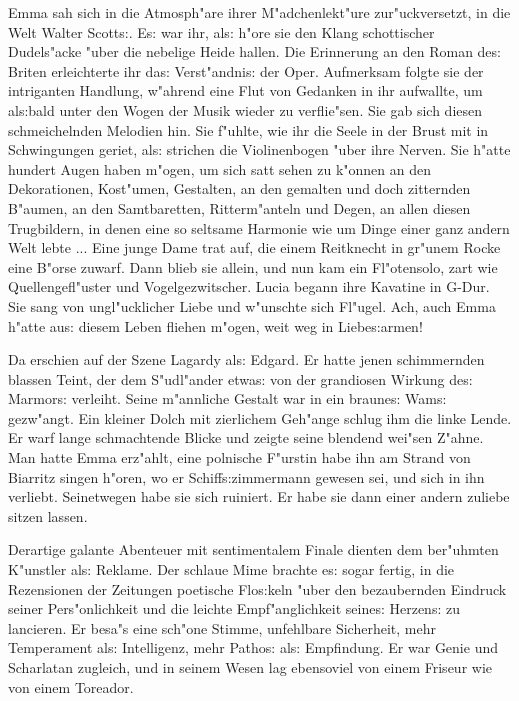 \documentclass[oneside,12pt]{book}
\newcommand{\s}{s:}%
\begin{document}
Emma sah sich in die Atmosph"are ihrer M"adchenlekt"ure
zur"uckversetzt, in die Welt Walter Scott{\s}. E{\s} war ihr,
al{\s} h"ore sie den Klang schottischer Dudels"acke "uber die
nebelige Heide hallen. Die Erinnerung an den Roman de{\s} Briten
erleichterte ihr da{\s} Verst"andni{\s} der Oper. Aufmerksam
folgte sie der intriganten Handlung, w"ahrend eine Flut von
Gedanken in ihr aufwallte, um al{\s}bald unter den Wogen der Musik
wieder zu verflie"sen. Sie gab sich diesen schmeichelnden Melodien
hin. Sie f"uhlte, wie ihr die Seele in der Brust mit in
Schwingungen geriet, al{\s} strichen die Violinenbogen "uber ihre
Nerven. Sie h"atte hundert Augen haben m"ogen, um sich satt sehen
zu k"onnen an den Dekorationen, Kost"umen, Gestalten, an den
gemalten und doch zitternden B"aumen, an den Samtbaretten,
Ritterm"anteln und Degen, an allen diesen Trugbildern, in denen
eine so seltsame Harmonie wie um Dinge einer ganz andern Welt
lebte ... Eine junge Dame trat auf, die einem Reitknecht in
gr"unem Rocke eine B"orse zuwarf. Dann blieb sie allein, und nun
kam ein Fl"otensolo, zart wie Quellengefl"uster und
Vogelgezwitscher. Lucia begann ihre Kavatine in G-Dur. Sie sang
von ungl"ucklicher Liebe und w"unschte sich Fl"ugel. Ach, auch
Emma h"atte au{\s} diesem Leben fliehen m"ogen, weit weg in
Liebe{\s}armen!

Da erschien auf der Szene Lagardy al{\s} Edgard. Er hatte jenen
schimmernden blassen Teint, der dem S"udl"ander etwa{\s} von der
grandiosen Wirkung de{\s} Marmor{\s} verleiht. Seine m"annliche
Gestalt war in ein braune{\s} Wam{\s} gezw"angt. Ein kleiner Dolch
mit zierlichem Geh"ange schlug ihm die linke Lende. Er warf lange
schmachtende Blicke und zeigte seine blendend wei"sen Z"ahne. Man
hatte Emma erz"ahlt, eine polnische F"urstin habe ihn am Strand
von Biarritz singen h"oren, wo er Schiff{\s}zimmermann gewesen
sei, und sich in ihn verliebt. Seinetwegen habe sie sich ruiniert.
Er habe sie dann einer andern zuliebe sitzen lassen.

Derartige galante Abenteuer mit sentimentalem Finale dienten dem
be\-r"uhm\-ten K"unstler al{\s} Reklame. Der schlaue Mime brachte
e{\s} sogar fertig, in die Rezensionen der Zeitungen poetische
Flo{\s}keln "uber den bezaubernden Eindruck seiner Pers"onlichkeit
und die leichte Empf"anglichkeit seine{\s} Herzen{\s} zu
lancieren. Er besa"s eine sch"one Stimme, unfehlbare Sicherheit,
mehr Temperament al{\s} Intelligenz, mehr Patho{\s} al{\s}
Empfindung. Er war Genie und Scharlatan zugleich, und in seinem
Wesen lag ebensoviel von einem Friseur wie von einem Toreador.
\end{document}
